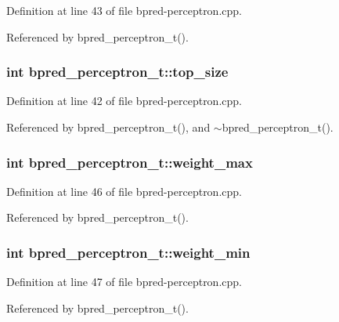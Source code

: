 Definition at line 43 of file bpred-perceptron.cpp.

Referenced by bpred\_\-perceptron\_\-t().
\subsubsection[{top\_\-size}]{\setlength{\rightskip}{0pt plus 5cm}int {\bf bpred\_\-perceptron\_\-t::top\_\-size}\hspace{0.3cm}{\tt  [protected]}}\label{classbpred__perceptron__t_b03ef82723fc3a68e76b67cde1e49c91}




Definition at line 42 of file bpred-perceptron.cpp.

Referenced by bpred\_\-perceptron\_\-t(), and $\sim$bpred\_\-perceptron\_\-t().
\subsubsection[{weight\_\-max}]{\setlength{\rightskip}{0pt plus 5cm}int {\bf bpred\_\-perceptron\_\-t::weight\_\-max}\hspace{0.3cm}{\tt  [protected]}}\label{classbpred__perceptron__t_3c35967d834536dbbc1b13a486550390}




Definition at line 46 of file bpred-perceptron.cpp.

Referenced by bpred\_\-perceptron\_\-t().
\subsubsection[{weight\_\-min}]{\setlength{\rightskip}{0pt plus 5cm}int {\bf bpred\_\-perceptron\_\-t::weight\_\-min}\hspace{0.3cm}{\tt  [protected]}}\label{classbpred__perceptron__t_5b2da633ea34e3201094dad5be83bcaf}




Definition at line 47 of file bpred-perceptron.cpp.

Referenced by bpred\_\-perceptron\_\-t().
